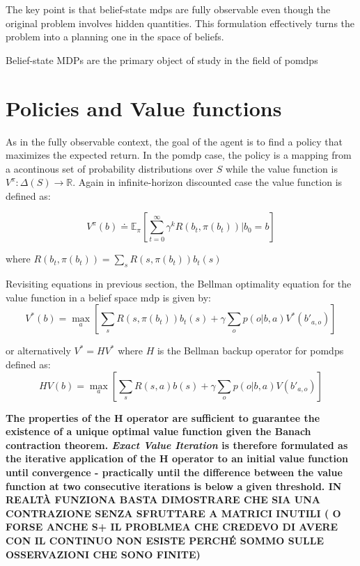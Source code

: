 \documentclass[a4paper,11pt]{report}
\theoremstyle{definition}
\theoremstyle{plain}
\theoremstyle{remark}  %
\begin{document}
The key point is that belief-state \gls{mdp}s are fully
observable even though the original problem involves hidden quantities. This
formulation effectively turns the problem into a planning one in the space of beliefs.

Belief-state MDPs are the primary object of study in the field of \gls{pomdp}s

\section{Policies and Value functions}
As in the fully observable context, the goal of the agent is to find a policy that maximizes the expected 
return. In the \gls{pomdp} case, the policy is a mapping from a acontinous set of probability distributions 
over $S$ while the value function is $V^{\pi} : \Delta(S) \rightarrow \mathbb{R}$. 
Again in infinite-horizon discounted case the value function is defined as:

$$V^{\pi}(b) \doteq \mathbb{E}_{\pi}\left[ \sum ^\infty _{t=0} \gamma^k R(b_t,\pi(b_t)) | b_0 = b  \right]$$

where $R(b_t,\pi(b_t)) = \sum_s R(s,\pi(b_t))b_t(s)$


Revisiting equations in previous section, the Bellman optimality equation for the value function 
in a belief space \gls{mdp} is given by:
$$V^* (b) = \max_a \left[\sum_s R(s,\pi(b_t))b_t(s) + \gamma\sum_o p(o|b,a) V^*(b'_{a,o}) \right]$$

or alternatively $V^* = HV^*$ where $H$ is the Bellman backup operator for \gls{pomdp}s defined as:
$$H V(b) = \max_a \left[\sum_s R(s,a)b(s) + \gamma\sum_o p(o|b,a) V(b'_{a,o}) \right]$$

\textbf{The properties of the H operator are sufficient to guarantee the existence of a unique optimal value 
function given the Banach contraction theorem. \textit{Exact Value Iteration} is therefore formulated 
as the iterative application of the H operator to an initial value function until convergence - practically 
until the difference between the value function at two consecutive iterations is below a given threshold.
IN REALTÀ FUNZIONA BASTA DIMOSTRARE CHE SIA UNA CONTRAZIONE SENZA SFRUTTARE A MATRICI INUTILI ( O FORSE 
ANCHE S+ IL PROBLMEA CHE CREDEVO DI AVERE CON IL CONTINUO NON ESISTE PERCHÉ SOMMO SULLE OSSERVAZIONI CHE SONO 
FINITE)
}
\end{document}
